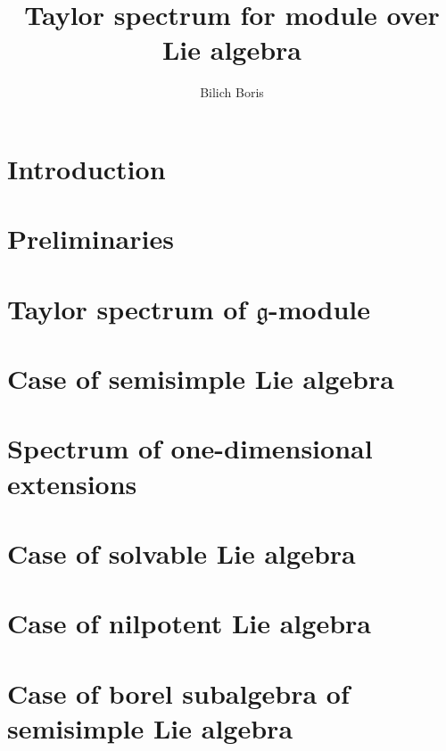 \documentclass[12pt,a4paper]{amsart}
\author{Bilich Boris}
\title{Taylor spectrum for module over Lie algebra}
\newcommand{\lieg}{\mathfrak{g}}
\begin{document}
\maketitle
\section{Introduction}%
\label{sec:introduction}


\section{Preliminaries}%
\label{sec:preliminaries}


\section{Taylor spectrum of $\lieg$-module}%
\label{sec:spectrumofmodule}


\section{Case of semisimple Lie algebra}%
\label{sec:semisimple}


\section{Spectrum of one-dimensional extensions}%
\label{sec:1extensions}


\section{Case of solvable Lie algebra}%
\label{sec:solvable}


\section{Case of nilpotent Lie algebra}
\label{sec:nilpotent}


\section{Case of borel subalgebra of semisimple Lie algebra}
\label{sec:borel}

\end{document}
